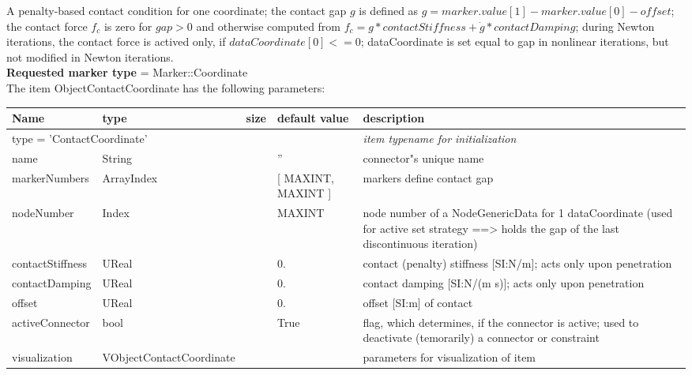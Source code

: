 A penalty-based contact condition for one coordinate; the contact gap $g$ is defined as $g=marker.value[1]- marker.value[0] - offset$; the contact force $f_c$ is zero for $gap>0$ and otherwise computed from $f_c = g*contactStiffness + \dot g*contactDamping$; during Newton iterations, the contact force is actived only, if $dataCoordinate[0] <= 0$; dataCoordinate is set equal to gap in nonlinear iterations, but not modified in Newton iterations.
 \\  {\bf Requested marker type} = Marker::Coordinate \\ 
The item ObjectContactCoordinate has the following parameters:
\begin{center}
  \footnotesize
  \begin{longtable}{| p{4.5cm} | p{2.5cm} | p{0.5cm} | p{2.5cm} | p{6cm} |}
    \hline
    \bf Name & \bf type & \bf size & \bf default value & \bf description \\ \hline
    \multicolumn{4}{l}{\parbox{10cm}{type = 'ContactCoordinate'}} & \multicolumn{1}{l}{\parbox{6cm}{\it item typename for initialization}}\\ \hline
    name &     String &      &     '' &     connector"s unique name\\ \hline
    markerNumbers &     ArrayIndex &      &     [ MAXINT, MAXINT ] &     markers define contact gap\\ \hline
    nodeNumber &     Index &      &     MAXINT &     node number of a NodeGenericData for 1 dataCoordinate (used for active set strategy ==> holds the gap of the last discontinuous iteration)\\ \hline
    contactStiffness &     UReal &      &     0. &     contact (penalty) stiffness [SI:N/m]; acts only upon penetration\\ \hline
    contactDamping &     UReal &      &     0. &     contact damping [SI:N/(m s)]; acts only upon penetration\\ \hline
    offset &     UReal &      &     0. &     offset [SI:m] of contact\\ \hline
    activeConnector &     bool &      &     True &     flag, which determines, if the connector is active; used to deactivate (temorarily) a connector or constraint\\ \hline
    visualization & VObjectContactCoordinate & & & parameters for visualization of item \\ \hline
	  \end{longtable}
	\end{center}
